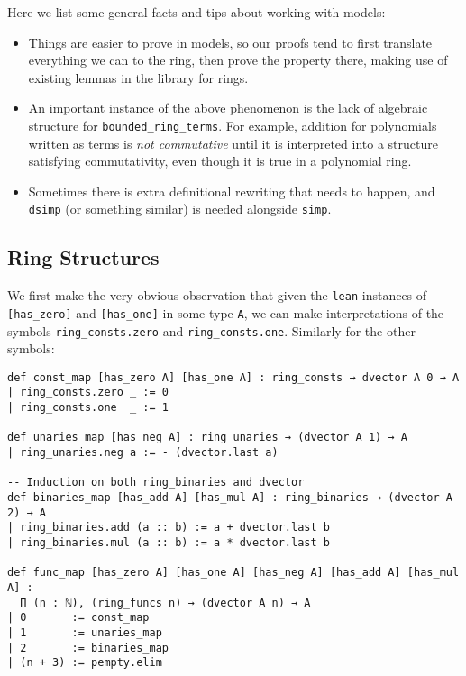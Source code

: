 Here we list some general facts and tips about working with models:
\begin{itemize}
  \item Things are easier to prove in models, so our proofs tend to
        first translate everything we can to the ring,
        then prove the property there,
        making use of existing lemmas in the library for rings.
  \item An important instance of the above phenomenon is the lack
        of algebraic structure for \texttt{bounded\_ring\_terms}.
        For example, addition for polynomials written as terms
        is \textit{not commutative} until it is interpreted into a structure
        satisfying commutativity,
        even though it is true in a polynomial ring.
  \item Sometimes there is extra definitional rewriting that needs to happen,
        and \texttt{dsimp} (or something similar) is needed alongside \texttt{simp}.
\end{itemize}

\subsection{Ring Structures}

We first make the very obvious observation that given
the \texttt{lean} instances of \texttt{[has\_zero]} and \texttt{[has\_one]}
in some type \texttt{A},
we can make interpretations of the symbols \texttt{ring\_consts.zero}
and \texttt{ring\_consts.one}.
Similarly for the other symbols:

\begin{lstlisting}
def const_map [has_zero A] [has_one A] : ring_consts → dvector A 0 → A
| ring_consts.zero _ := 0
| ring_consts.one  _ := 1

def unaries_map [has_neg A] : ring_unaries → (dvector A 1) → A
| ring_unaries.neg a := - (dvector.last a)

-- Induction on both ring_binaries and dvector
def binaries_map [has_add A] [has_mul A] : ring_binaries → (dvector A 2) → A
| ring_binaries.add (a :: b) := a + dvector.last b
| ring_binaries.mul (a :: b) := a * dvector.last b

def func_map [has_zero A] [has_one A] [has_neg A] [has_add A] [has_mul A] :
  Π (n : ℕ), (ring_funcs n) → (dvector A n) → A
| 0       := const_map
| 1       := unaries_map
| 2       := binaries_map
| (n + 3) := pempty.elim\end{lstlisting}

